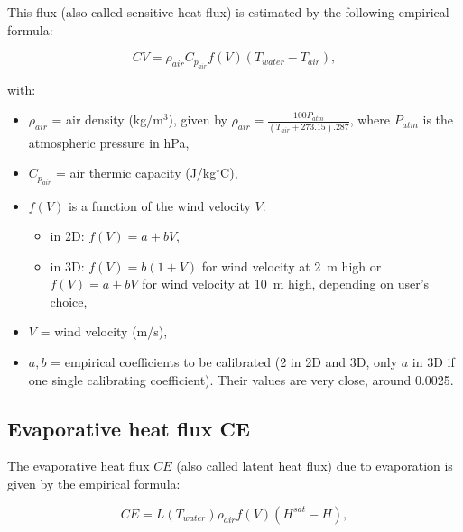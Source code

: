 This flux (also called sensitive heat flux)
is estimated by the following empirical formula:

\begin{equation}
  CV = \rho_{air} C_{p_{air}} f(V) (T_{water} - T_{air}),
\end{equation}

with:
\begin{itemize}
  \item $\rho_{air}$ = air density (kg/m$^3$),
    given by $\rho_{air} = \frac{100 P_{atm}}{(T_{air} + 273.15).287}$,
    where $P_{atm}$ is the atmospheric pressure in hPa,
  \item $C_{p_{air}}$ = air thermic capacity (J/kg$^{\circ}$C),
  \item $f(V)$ is a function of the wind velocity $V$:
    \begin{itemize}
    \item in 2D: $f(V) = a+bV$,
    \item in 3D: $f(V) = b(1+V)$ for wind velocity at 2~m high
      or $f(V) = a+bV$ for wind velocity at 10~m high,
      depending on user's choice,
    \end{itemize}
  \item $V$ = wind velocity (m/s),
  \item $a, b$ = empirical coefficients
    to be calibrated (2 in 2D and 3D, only $a$ in 3D if one single calibrating coefficient).
    Their values are very close, around 0.0025.
\end{itemize}

\subsection{Evaporative heat flux CE}

The evaporative heat flux $CE$ (also called latent heat flux)
due to evaporation is given by the empirical formula:

\begin{equation}
  CE = L(T_{water}) \rho_{air} f(V) (H^{sat} - H),
\end{equation}

